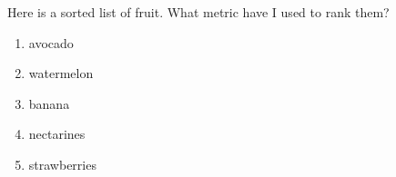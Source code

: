 \Large Here is a sorted list of fruit. What metric have I used to rank them?
\begin{enumerate}
   \item avocado
   \item watermelon
   \item banana
   \item nectarines
   \item strawberries
\end{enumerate}
